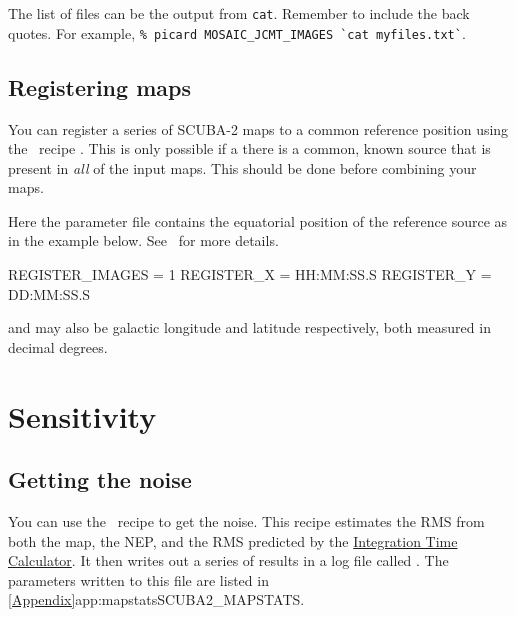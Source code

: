 \begin{tip}
  The list of files can be the output from \texttt{cat}. Remember
  to include the back quotes.  For example, \texttt{\% picard
    MOSAIC\_JCMT\_IMAGES \`{}cat myfiles.txt\`{}}.
\end{tip}


\subsection{Registering maps}

You can register a series of SCUBA-2 maps to a common reference
position using the \picard\ recipe
.
This is only possible if a there is a common, known source that is
present in \textit{all} of the input maps. This should be done before
combining your maps.

\begin{terminalv}
\end{terminalv}

Here the parameter file contains the equatorial position of the
reference source as in the example below. See \picardsun\ for more
details.

\begin{terminalv}
REGISTER_IMAGES = 1
REGISTER_X  = HH:MM:SS.S
REGISTER_Y  = DD:MM:SS.S
\end{terminalv}

 and  may also be galactic
longitude and latitude respectively, both measured in decimal
degrees.

\section{Sensitivity}

\subsection{Getting the noise}
\label{sec:mapstats}

You can use the \picard\ recipe  to get the
noise. This recipe estimates the RMS from both the map, the NEP, and
the RMS predicted by the
 \href{https://www.eaobservatory.org/jcmt/instrumentation/continuum/scuba-2/itc/}{Integration 
 Time Calculator}. It then writes out
a series of results in a log file called . The
parameters written to this file are listed in
\cref{Appendix}{app:mapstats}{SCUBA2_MAPSTATS}.

